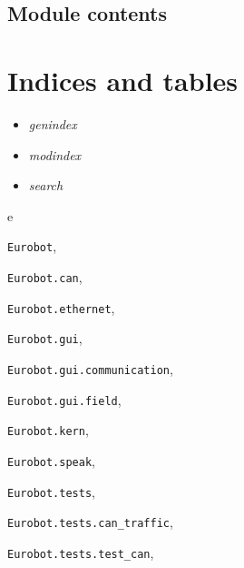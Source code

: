 \documentclass[letterpaper,10pt,english]{sphinxmanual}
\begin{document}
\begin{fulllineitems}
\label{Eurobot:Eurobot.speak.speak}
\end{fulllineitems}



\section{Module contents}
\label{Eurobot:module-contents}\label{Eurobot:module-Eurobot}

\chapter{Indices and tables}
\label{index:indices-and-tables}\begin{itemize}
\item {} 
\emph{genindex}

\item {} 
\emph{modindex}

\item {} 
\emph{search}

\end{itemize}


\renewcommand{\indexname}{Python Module Index}
\begin{theindex}
\def\bigletter#1{{\Large\sffamily#1}\nopagebreak\vspace{1mm}}
\bigletter{e}
\item {\texttt{Eurobot}}, \pageref{Eurobot:module-Eurobot}
\item {\texttt{Eurobot.can}}, \pageref{Eurobot:module-Eurobot.can}
\item {\texttt{Eurobot.ethernet}}, \pageref{Eurobot:module-Eurobot.ethernet}
\item {\texttt{Eurobot.gui}}, \pageref{Eurobot.gui:module-Eurobot.gui}
\item {\texttt{Eurobot.gui.communication}}, \pageref{Eurobot.gui:module-Eurobot.gui.communication}
\item {\texttt{Eurobot.gui.field}}, \pageref{Eurobot.gui:module-Eurobot.gui.field}
\item {\texttt{Eurobot.kern}}, \pageref{Eurobot:module-Eurobot.kern}
\item {\texttt{Eurobot.speak}}, \pageref{Eurobot:module-Eurobot.speak}
\item {\texttt{Eurobot.tests}}, \pageref{Eurobot.tests:module-Eurobot.tests}
\item {\texttt{Eurobot.tests.can\_traffic}}, \pageref{Eurobot.tests:module-Eurobot.tests.can_traffic}
\item {\texttt{Eurobot.tests.test\_can}}, \pageref{Eurobot.tests:module-Eurobot.tests.test_can}
\end{theindex}

\renewcommand{\indexname}{Index}
\printindex
\end{document}
